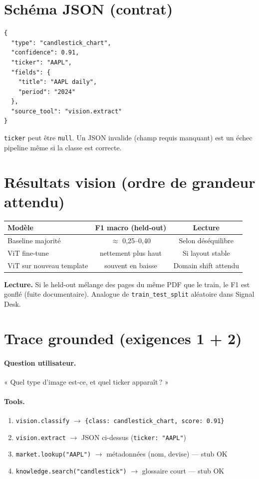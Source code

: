\documentclass[11pt,a4paper]{article}
\begin{document}
\section{Schéma JSON (contrat)}

\begin{verbatim}
{
  "type": "candlestick_chart",
  "confidence": 0.91,
  "ticker": "AAPL",
  "fields": {
    "title": "AAPL daily",
    "period": "2024"
  },
  "source_tool": "vision.extract"
}
\end{verbatim}

\texttt{ticker} peut être \texttt{null}. Un JSON invalide (champ requis manquant)
est un échec pipeline même si la classe est correcte.

\section{Résultats vision (ordre de grandeur attendu)}

\begin{center}
\renewcommand{\arraystretch}{1.2}
\begin{tabular}{@{}lcc@{}}
\toprule
\textbf{Modèle} & \textbf{F1 macro (held-out)} & \textbf{Lecture} \\
\midrule
Baseline majorité & $\approx$ 0{,}25--0{,}40 & Selon déséquilibre \\
ViT fine-tune & nettement plus haut & Si layout stable \\
ViT sur nouveau template & souvent en baisse & Domain shift attendu \\
\bottomrule
\end{tabular}
\end{center}

{\color{warn}\textbf{Lecture.}
Si le held-out mélange des pages du même PDF que le train, le F1 est gonflé
(fuite documentaire). Analogue de \texttt{train\_test\_split} aléatoire dans Signal Desk.}

\section{Trace grounded (exigences 1 + 2)}

\paragraph{Question utilisateur.} « Quel type d'image est-ce, et quel ticker apparaît\,? »

\paragraph{Tools.}
\begin{enumerate}
  \item \texttt{vision.classify} $\rightarrow$ \texttt{\{class: candlestick\_chart, score: 0.91\}}
  \item \texttt{vision.extract} $\rightarrow$ JSON ci-dessus (\texttt{ticker: "AAPL"})
  \item \texttt{market.lookup("AAPL")} $\rightarrow$ métadonnées (nom, devise) --- stub OK
  \item \texttt{knowledge.search("candlestick")} $\rightarrow$ glossaire court --- stub OK
\end{enumerate}
\end{document}
